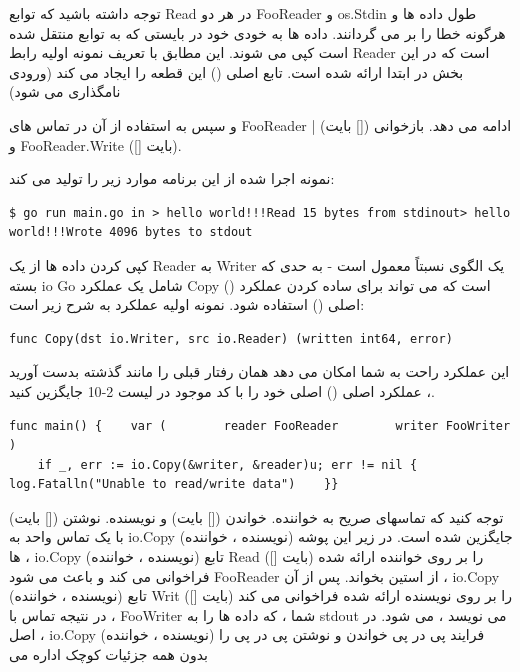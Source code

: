 \documentclass[12pt]{book}
\begin{document}
توجه داشته باشید که توابع Read در هر دو FooReader و os.Stdin طول داده ها و هرگونه خطا را بر می گردانند. داده ها به خودی خود در بایستی که به توابع منتقل شده است کپی می شوند. این مطابق با تعریف نمونه اولیه رابط Reader است که در این بخش در ابتدا ارائه شده است. تابع اصلی () این قطعه را ایجاد می کند (ورودی نامگذاری می شود) {و سپس به استفاده از آن در تماس های FooReader ادامه می دهد. بازخوانی ([] بایت) | و FooReader.Write ([] بایت).

	نمونه اجرا شده از این برنامه موارد زیر را تولید می کند:
	\begin{latin}
		\begin{lstlisting}$ go run main.go in > hello world!!!Read 15 bytes from stdinout> hello world!!!Wrote 4096 bytes to stdout
		\end{lstlisting}
	\end{latin}

کپی کردن داده ها از یک Reader به Writer یک الگوی نسبتاً معمول است - به حدی که بسته io Go شامل یک عملکرد Copy () است که می تواند برای ساده کردن عملکرد اصلی () استفاده شود. نمونه اولیه عملکرد به شرح زیر است:
\begin{latin}
	\begin{lstlisting}func Copy(dst io.Writer, src io.Reader) (written int64, error)
	\end{lstlisting}
\end{latin}

این عملکرد راحت به شما امکان می دهد همان رفتار قبلی را مانند گذشته بدست آورید ، عملکرد اصلی () اصلی خود را با کد موجود در لیست 2-10 جایگزین کنید.
\begin{latin}
	\begin{lstlisting}[caption={Using io.Copy (https://github.com/blackhat-go/ch-3/copy-example/main.go/)},captionpos=b]
	func main() {    var (        reader FooReader        writer FooWriter    )
	if _, err := io.Copy(&writer, &reader)u; err != nil {        log.Fatalln("Unable to read/write data")    }}
	\end{lstlisting}
\end{latin}

توجه كنید كه تماسهای صریح به خواننده. خواندن ([] بایت) و نویسنده. نوشتن ([] بایت) با یک تماس واحد به io.Copy (نویسنده ، خواننده) جایگزین شده است. در زیر این پوشه ها ، io.Copy (نویسنده ، خواننده) تابع Read ([] بایت) را بر روی خواننده ارائه شده فراخوانی می کند و باعث می شود FooReader از استین بخواند. پس از آن ، io.Copy (نویسنده ، خواننده) تابع Writ ([] بایت) را بر روی نویسنده ارائه شده فراخوانی می کند ، در نتیجه تماس با FooWriter شما ، که داده ها را به stdout می نویسد ، می شود. در اصل ، io.Copy (نویسنده ، خواننده) فرایند پی در پی خواندن و نوشتن پی در پی را بدون همه جزئیات کوچک اداره می

}
\end{document}
